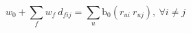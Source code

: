 \begin{equation}
\label{eq:determinacao-wf} 
    w_0 + \sum_{f}{w_{f} ~ d_{fij}} = \sum_{u}{\mathrm{b_0}\left(r_{ui} ~ r_{uj}\right)},~\forall i \neq j 
\end{equation} 









%
%
